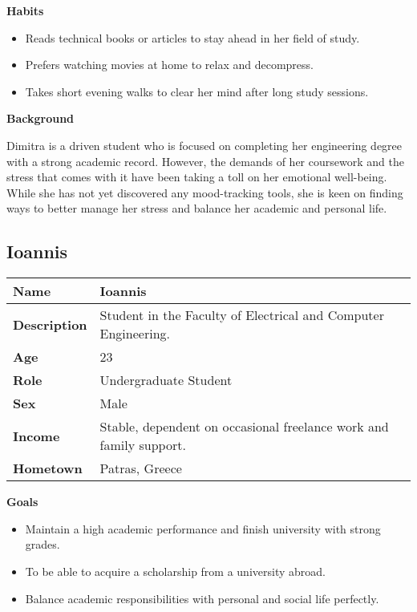 \begin{center} \textbf{Habits} \end{center}
\begin{itemize}
    \item Reads technical books or articles to stay ahead in her field of study.
    \item Prefers watching movies at home to relax and decompress.
    \item Takes short evening walks to clear her mind after long study sessions.
\end{itemize}

\begin{center} \textbf{Background} \end{center}
Dimitra is a driven student who is focused on completing her engineering degree with a strong academic record. However, the demands of her coursework and the stress that comes with it have been taking a toll on her emotional well-being. While she has not yet discovered any mood-tracking tools, she is keen on finding ways to better manage her stress and balance her academic and personal life.

\subsection{Ioannis}

\FloatBarrier
\begin{table}[ht]
\centering
\begin{tabular}{|l|p{11cm}|}
\hline
\textbf{Name} & Ioannis \\ \hline
\textbf{Description} & Student in the Faculty of Electrical and Computer Engineering. \\ \hline
\textbf{Age} & 23 \\ \hline
\textbf{Role} & Undergraduate Student \\ \hline
\textbf{Sex} & Male \\ \hline
\textbf{Income} & Stable, dependent on occasional freelance work and family support. \\ \hline
\textbf{Hometown} & Patras, Greece \\ \hline
\end{tabular}
\label{tab:persona_ioannis}
\end{table}
\FloatBarrier

\begin{center} \textbf{Goals} \end{center}
\begin{itemize}
    \item Maintain a high academic performance and finish university with strong grades.
    \item To be able to acquire a scholarship from a university abroad.
    \item Balance academic responsibilities with personal and social life perfectly.
\end{itemize}


